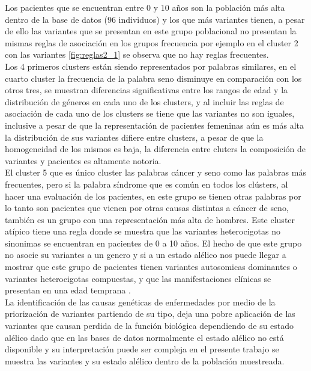 Los pacientes que se encuentran entre 0 y 10 años son la población más alta dentro de la base de datos (96 individuos)  y los que más variantes tienen, a pesar de ello las variantes que se presentan en este grupo poblacional no presentan la mismas reglas de asociación en los grupos frecuencia por ejemplo en el cluster 2 con las variantes \ref{fig:reglas2_1} se observa que no hay reglas frecuentes.\\ 

Los 4 primeros clusters están siendo representados por palabras similares, en el cuarto cluster la frecuencia de la palabra seno disminuye en comparación con los otros tres, se muestran diferencias significativas entre los rangos de edad y la distribución de géneros en cada uno de los clusters, y al incluir las reglas de asociación de cada uno de los clusters se tiene que las variantes no son iguales, inclusive a pesar de que la representación de pacientes femeninas aún es más alta la distribución de sus variantes difiere entre clusters, a pesar de que la homogeneidad de los mismos es baja, la diferencia entre cluters la composición de variantes y pacientes es altamente notoria.\\  

El cluster 5 que es único cluster las palabras cáncer y seno como las palabras más frecuentes, pero si la palabra síndrome que es común en todos los clústers, al hacer una evaluación de los pacientes, en este grupo se tienen otras palabras por lo tanto son pacientes que vienen por otras causas distintas a cáncer de seno, también es un grupo con una representación más alta de hombres. Este cluster atípico tiene una regla donde se muestra que las variantes heterocigotas no sinonimas se encuentran  en pacientes de 0 a 10 años. El hecho de que este grupo no asocie su variantes a un genero y si a un estado alélico nos puede llegar a mostrar que este grupo de pacientes tienen variantes autosomicas dominantes o variantes heterocigotas compuestas, y que las manifestaciones clínicas se presentan en una edad temprana \cite{Kamphans2013}. \\

La identificación de las causas genéticas de enfermedades por medio de la priorización de variantes partiendo de su tipo, deja una pobre aplicación de las variantes que causan perdida de la función biológica dependiendo de su estado alélico \cite{Eilbeck2017} dado que en las bases de datos normalmente el estado alélico no está disponible y su interpretación puede ser compleja \cite{Stenson2017} en el presente trabajo se muestra las variantes y su estado alélico dentro de la población muestreada. 


